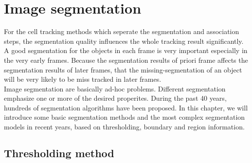 \chapter{Image segmentation}
For the cell tracking methods which seperate the segmentation and association steps, the segmentation quality influences the whole tracking result significantly. A good segmentation for the objects in each frame is very important especially in the very early frames. Because the segmentation results of priori frame affects the segmentation results of later frames, that the missing-segmentation of an object will be very likely to be miss tracked in later frames.\\
Image segmentation are basically ad-hoc problems. Different segmentation emphasize one or more of the desired properites. During the past 40 years, hundreds of segmentation algorithms have been proposed\cite{freixenet2002yet}. In this chapter, we will introduce some basic segmentation methods and the most complex segmentation models in recent years, based on thresholding, boundary and region information.
\section{Thresholding method}
